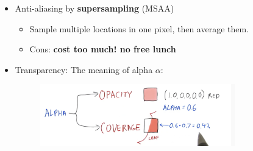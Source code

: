 \documentclass{article}
\begin{document}
\begin{itemize}
\begin{itemize}
\end{itemize}

\item Anti-aliasing by \textbf{supersampling} (MSAA)
\begin{itemize}
    \item Sample multiple locations in one pixel, then average them.
    \item Cons: \textbf{cost too much! no free lunch}
\end{itemize}

\item Transparency: The meaning of alpha $\alpha$:
\begin{figure}
    \centering
    \includegraphics[width=0.8\textwidth]{imgs/alpha.png}
\end{figure}



\end{itemize}
\end{document}
